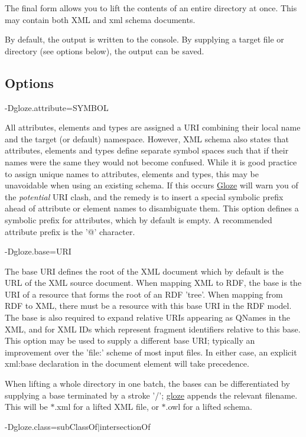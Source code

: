 The final form allows you to lift the contents of an entire directory at once. This may contain both XML and xml schema documents.

By default, the output is written to the console. By supplying a target file or directory (see options below), the output can be saved.\hypertarget{gettingstarted_options}{}\subsection{Options}\label{gettingstarted_options}
{\ttfamily -\/Dgloze.attribute=SYMBOL}

All attributes, elements and types are assigned a URI combining their local name and the target (or default) namespace. However, XML schema also states that attributes, elements and types define separate symbol spaces such that if their names were the same they would not become confused. While it is good practice to assign unique names to attributes, elements and types, this may be unavoidable when using an existing schema. If this occurs \hyperlink{classcom_1_1hp_1_1gloze_1_1_gloze}{Gloze} will warn you of the {\itshape potential\/} URI clash, and the remedy is to insert a special symbolic prefix ahead of attribute or element names to disambiguate them. This option defines a symbolic prefix for attributes, which by default is empty. A recommended attribute prefix is the '@' character.

{\ttfamily -\/Dgloze.base=URI}

The base URI defines the root of the XML document which by default is the URL of the XML source document. When mapping XML to RDF, the base is the URI of a resource that forms the root of an RDF 'tree'. When mapping from RDF to XML, there must be a resource with this base URI in the RDF model. The base is also required to expand relative URIs appearing as QNames in the XML, and for XML IDs which represent fragment identifiers relative to this base. This option may be used to supply a different base URI; typically an improvement over the 'file:' scheme of most input files. In either case, an explicit xml:base declaration in the document element will take precedence.

When lifting a whole directory in one batch, the bases can be differentiated by supplying a base terminated by a stroke '/'; \hyperlink{namespacecom_1_1hp_1_1gloze}{gloze} appends the relevant filename. This will be $\ast$.xml for a lifted XML file, or $\ast$.owl for a lifted schema.

{\ttfamily -\/Dgloze.class=subClassOf$|$intersectionOf}

